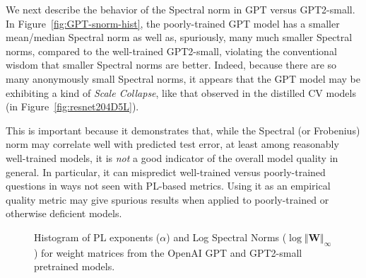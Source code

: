 We next describe the behavior of the Spectral norm in GPT versus GPT2-small.
In Figure~\ref{fig:GPT-snorm-hist}, the poorly-trained GPT model has a smaller mean/median Spectral norm as well as, spuriously, many much smaller Spectral norms, compared to the well-trained GPT2-small, violating the conventional wisdom that smaller Spectral norms are better.
Indeed, because there are so many anonymously small Spectral norms, it appears that the GPT model may be exhibiting a kind of \emph{Scale Collapse}, like that observed in the distilled CV models (in Figure~\ref{fig:resnet204D5L}).

This is important because it demonstrates that, while the Spectral (or Frobenius) norm may correlate well with predicted test error, at least among reasonably well-trained models, it is \emph{not} a good indicator of the overall model quality in general.
In particular, it can mispredict well-trained versus poorly-trained questions in ways not seen with PL-based metrics.
Using it as an empirical quality metric may give spurious results when applied to poorly-trained or otherwise deficient models. 

\begin{figure}[h]
    \centering
    \qquad
   \caption{Histogram of PL exponents ($\alpha$) and Log Spectral Norms ($\log\Vert\mathbf{W}\Vert_{\infty}$) for weight matrices from the OpenAI GPT and GPT2-small pretrained models.}
   
\label{fig:GPT-hist}
\end{figure}


